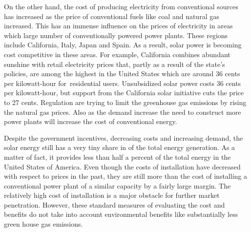 \documentclass[12pt]{article}
\begin{document}
\vspace{\baselineskip}
\begin{justify}
On the other hand, the cost of producing electricity from conventional sources has increased as the price of conventional fuels like coal and natural gas increased. This has an immense influence on the prices of electricity in areas which large number of conventionally powered power plants. These regions include California, Italy, Japan and Spain. As a result, solar power is becoming cost competitive in these areas. For example, California combines abundant sunshine with retail electricity prices that, partly as a result of the state’s policies, are among the highest in the United States which are around 36 cents per kilowatt-hour for\ residential users. Unsubsidized solar power costs 36 cents per kilowatt-hour, but support from the California solar initiative cuts the price to 27 cents. Regulation are trying to limit the greenhouse gas emissions by rising the natural gas prices.  Also as the demand increase the need to construct more power plants will increase the cost of conventional energy. 
\end{justify}\par


\vspace{\baselineskip}
\begin{justify}
Despite the government incentives, decreasing costs and increasing demand, the solar energy still has a very tiny share in of the total energy generation. As a matter of fact, it provides less than half a percent of the total energy in the United States of America. Even though the costs of installation have decreased with respect to prices in the past, they are still more than the cost of installing a conventional power plant of a similar capacity by a fairly large margin. The relatively high cost of installation is a major obstacle for further market penetration. However, these standard measures of evaluating the cost and benefits do not take into account environmental benefits like substantially less green house gas emissions. 
\end{justify}\par
\end{document}

